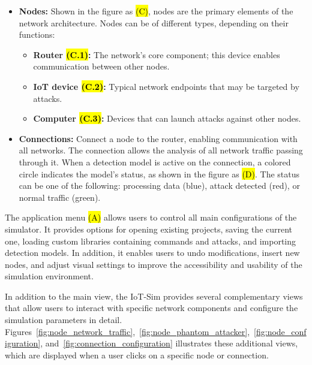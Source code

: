 \begin{itemize}
    \item \textbf{Nodes:} Shown in the figure as \textcolor{white}{\hl{(C)}}, nodes are the primary elements of the network architecture. Nodes can be of different types, depending on their functions:
    \begin{itemize}
        \item \textbf{Router \textcolor{white}{\hl{(C.1)}}:} The network's core component; this device enables communication between other nodes.
        \item \textbf{IoT device \textcolor{white}{\hl{(C.2)}}:} Typical network endpoints that may be targeted by attacks.
        \item \textbf{Computer \textcolor{white}{\hl{(C.3)}}:} Devices that can launch attacks against other nodes.
    \end{itemize}
    \item \textbf{Connections:} Connect a node to the router, enabling communication with all networks. The connection allows the analysis of all network traffic passing through it. When a detection model is active on the connection, a colored circle indicates the model's status, as shown in the figure as \hl{(D)}. The status can be one of the following: processing data (blue), attack detected (red), or normal traffic (green).
\end{itemize}

The application menu \textcolor{white}{\hl{(A)}} allows users to control all main configurations of the simulator. It provides options for opening existing projects, saving the current one, loading custom libraries containing commands and attacks, and importing detection models. In addition, it enables users to undo modifications, insert new nodes, and adjust visual settings to improve the accessibility and usability of the simulation environment.

In addition to the main view, the IoT-Sim provides several complementary views that allow users to interact with specific network components and configure the simulation parameters in detail. 
Figures~\ref{fig:node_network_traffic},~\ref{fig:node_phantom_attacker},~\ref{fig:node_configuration}, and~\ref{fig:connection_configuration} illustrates these additional views, which are displayed when a user clicks on a specific node or connection.

